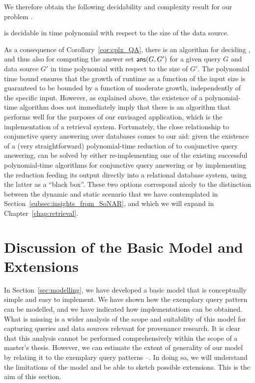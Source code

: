 We therefore obtain the following decidability and complexity result
for our problem .
%
\begin{corollary}
  \label{cor:cplx_QA}
   is decidable
  in time polynomial with respect to the size of the data source.
\end{corollary}
%
As a consequence of Corollary~\ref{cor:cplx_QA}, 
there is an algorithm for deciding ,
and thus also for computing the answer set $\textsf{ans}(G,G')$
for a given query $G$ and data source $G'$ in time polynomial
with respect to the size of $G'$.
The polynomial time bound ensures that the growth of runtime
as a function of the input size is guaranteed to be bounded by a function
of moderate growth, independently of the specific input.
However, as explained above,
the existence of a polynomial-time algorithm does not immediately imply that there
is an algorithm that performs well for the purposes of our envisaged application,
which is the implementation of a retrieval system.
Fortunately, the close relationship to conjunctive query answering over databases
comes to our aid: 
given the existence of a (very straightforward) polynomial-time reduction
of  to conjunctive query answering,
 can be solved by either re-implementing one of the existing
successful polynomial-time algorithms for conjunctive query answering
or by implementing the reduction feeding its output directly into a relational database system,
using the latter as a \enquote{black box}.
These two options correspond nicely to the
distinction between the dynamic and static scenario
that we have contemplated in Section~\ref{subsec:insights_from_SoNAR},
and which we will expand in Chapter~\ref{chap:retrieval}.

\section{Discussion of the Basic Model and Extensions}
\label{sec:modelling_discussion}

In Section~\ref{sec:modelling}, we have developed a basic model
that is conceptually simple and easy to implement.
We have shown how the exemplary query pattern 
can be modelled, and we have indicated how implementations can be obtained.
What is missing is a wider analysis of the scope and suitability
of this model for capturing queries and data sources relevant
for provenance research.
It is clear that this analysis cannot be performed comprehensively
within the scope of a master's thesis.
However, we can estimate the extent of generality of our model
by relating it to the exemplary query patterns --.
In doing so, we will understand the limitations of the model
and be able to sketch possible extensions.
This is the aim of this section.

